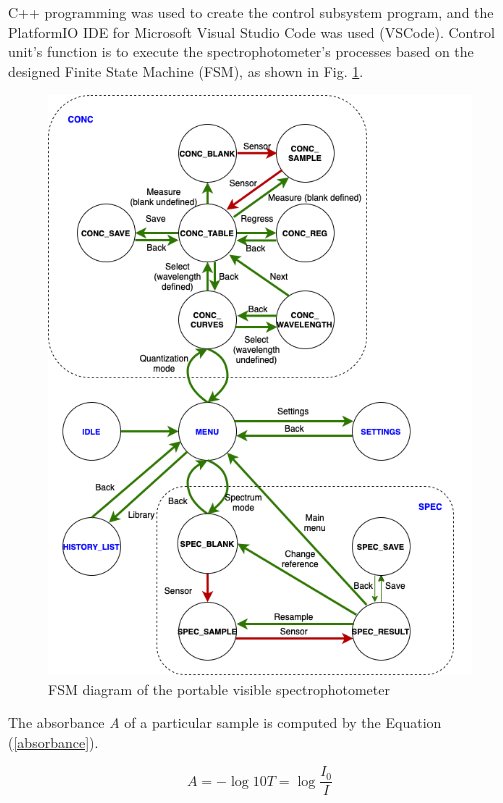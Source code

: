 \documentclass[conference]{IEEEtran}
\begin{document}
C++ programming was used to create the control subsystem program, and the PlatformIO IDE for Microsoft Visual Studio Code was used (VSCode).
Control unit's function is to execute the spectrophotometer's processes based on the designed Finite State Machine (FSM), as shown in Fig. \ref{fsm}.

    \begin{figure}[htbp]
    \centerline{\includegraphics[scale=0.35]{fsm.png}}
    \caption{FSM diagram of the portable visible spectrophotometer}
    \label{fsm}
    \end{figure}

The absorbance \emph{A} of a particular sample is computed by the Equation (\ref{absorbance}).

    \begin{equation}
    A=-\log10{T}=\log{\frac{I_{0}}{I}}
    \label{absorbance}
    \end{equation}
\end{document}
